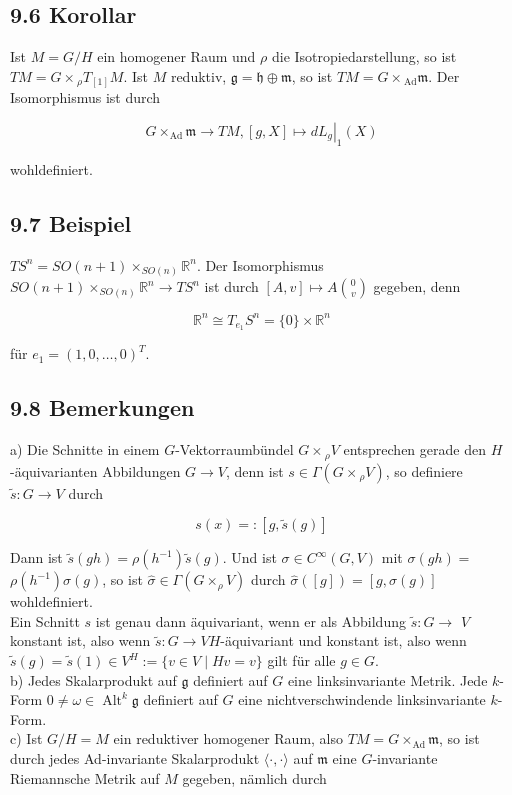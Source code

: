 \documentclass[10pt, letterpaper]{article}
\begin{document}
\subsection*{9.6 Korollar}
Ist $M=G / H$ ein homogener Raum und $\rho$ die Isotropiedarstellung, so ist $T M=G \times{ }_{\rho} T_{[1]} M$. Ist $M$ reduktiv, $\mathfrak{g}=\mathfrak{h} \oplus \mathfrak{m}$, so ist $T M=G \times{ }_{\mathrm{Ad}} \mathfrak{m}$. Der Isomorphismus ist durch

$$
G \times_{\mathrm{Ad}} \mathfrak{m} \rightarrow T M,\left.[g, X] \mapsto d L_{g}\right|_{1}(X)
$$

wohldefiniert.

\subsection*{9.7 Beispiel}
$T S^{n}=S O(n+1) \times_{S O(n)} \mathbb{R}^{n}$. Der Isomorphismus $S O(n+1) \times_{S O(n)} \mathbb{R}^{n} \rightarrow T S^{n}$ ist durch $[A, v] \mapsto A\binom{0}{v}$ gegeben, denn

$$
\mathbb{R}^{n} \cong T_{e_{1}} S^{n}=\{0\} \times \mathbb{R}^{n}
$$

für $e_{1}=(1,0, \ldots, 0)^{T}$.

\subsection*{9.8 Bemerkungen}
a) Die Schnitte in einem $G$-Vektorraumbündel $G \times{ }_{\rho} V$ entsprechen gerade den $H$-äquivarianten Abbildungen $G \rightarrow V$, denn ist $s \in \Gamma\left(G \times{ }_{\rho} V\right)$, so definiere $\tilde{s}: G \rightarrow V$ durch

$$
s(x)=:[g, \tilde{s}(g)]
$$

Dann ist $\tilde{s}(g h)=\rho\left(h^{-1}\right) \tilde{s}(g)$. Und ist $\sigma \in C^{\infty}(G, V)$ mit $\sigma(g h)=$ $\rho\left(h^{-1}\right) \sigma(g)$, so ist $\hat{\sigma} \in \Gamma\left(G \times_{\rho} V\right)$ durch $\hat{\sigma}([g])=[g, \sigma(g)]$ wohldefiniert.\\
Ein Schnitt $s$ ist genau dann äquivariant, wenn er als Abbildung $\tilde{s}: G \rightarrow$ $V$ konstant ist, also wenn $\tilde{s}: G \rightarrow V H$-äquivariant und konstant ist, also wenn $\tilde{s}(g)=\tilde{s}(1) \in V^{H}:=\{v \in V \mid H v=v\}$ gilt für alle $g \in G$.\\
b) Jedes Skalarprodukt auf $\mathfrak{g}$ definiert auf $G$ eine linksinvariante Metrik. Jede $k$-Form $0 \neq \omega \in \operatorname{Alt}^{k} \mathfrak{g}$ definiert auf $G$ eine nichtverschwindende linksinvariante $k$-Form.\\
c) Ist $G / H=M$ ein reduktiver homogener Raum, also $T M=G \times_{\mathrm{Ad}} \mathfrak{m}$, so ist durch jedes Ad-invariante Skalarprodukt $\langle\cdot, \cdot\rangle$ auf $\mathfrak{m}$ eine $G$-invariante Riemannsche Metrik auf $M$ gegeben, nämlich durch
\end{document}
